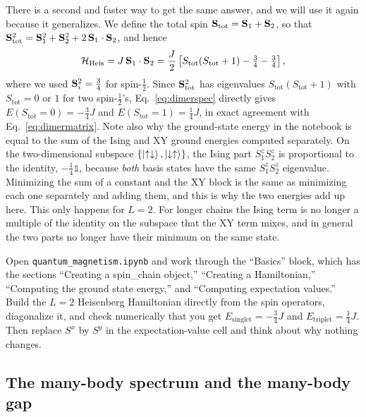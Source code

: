 \documentclass[lecture_notes.tex]{subfiles}
\begin{document}
There is a second and faster way to get the same answer, and we will use it again because it
generalizes. We define the total spin $\vb S_{\mathrm{tot}} = \vb S_1+\vb S_2$, so that
$\vb S_{\mathrm{tot}}^2 = \vb S_1^2+\vb S_2^2+2\,\vb S_1\cdot\vb S_2$, and hence
\begin{equation}
  \mathcal{H}_{\mathrm{Heis}} = J\,\vb S_1\cdot\vb S_2
    = \frac{J}{2}\left[S_{\mathrm{tot}}(S_{\mathrm{tot}}+1) - \tfrac34 - \tfrac34\right],
  \label{eq:dimerspec}
\end{equation}
where we used $\vb S_i^2=\tfrac34$ for spin-$\tfrac12$. Since $\vb S_{\mathrm{tot}}^2$ has
eigenvalues $S_{\mathrm{tot}}(S_{\mathrm{tot}}+1)$ with $S_{\mathrm{tot}}=0$ or $1$ for two
spin-$\tfrac12$'s, Eq.~\eqref{eq:dimerspec} directly gives $E(S_{\mathrm{tot}}=0)=-\tfrac34J$ and
$E(S_{\mathrm{tot}}=1)=\tfrac14J$, in exact agreement with Eq.~\eqref{eq:dimermatrix}. Note also why
the ground-state energy in the notebook is equal to the sum of the Ising and XY ground energies
computed separately. On the two-dimensional subspace $\{\ket{\uparrow\downarrow},\ket{\downarrow\uparrow}\}$, the Ising part
$S_1^zS_2^z$ is proportional to the identity, $-\tfrac14\mathbb{1}$, because \emph{both} basis states
have the same $S_1^zS_2^z$ eigenvalue. Minimizing the sum of a constant and the XY block is the same
as minimizing each one separately and adding them, and this is why the two energies add up here.
This only happens for $L=2$. For longer chains the Ising term is no longer a multiple of the identity
on the subspace that the XY term mixes, and in general the two parts no longer have their minimum on
the same state.

\begin{notebook}
Open \texttt{quantum\_magnetism.ipynb} and work through the ``Basics'' block, which has the sections
``Creating a spin\_chain object,'' ``Creating a Hamiltonian,'' ``Computing the ground state
energy,'' and ``Computing expectation values.'' Build the $L=2$ Heisenberg Hamiltonian directly from
the spin operators, diagonalize it, and check numerically that you get
$E_{\mathrm{singlet}}=-\tfrac34J$ and $E_{\mathrm{triplet}}=\tfrac14J$. Then replace $S^x$ by $S^y$
in the expectation-value cell and think about why nothing changes.
\end{notebook}

\subsection{The many-body spectrum and the many-body gap}
\label{sec:gap}
\end{document}
